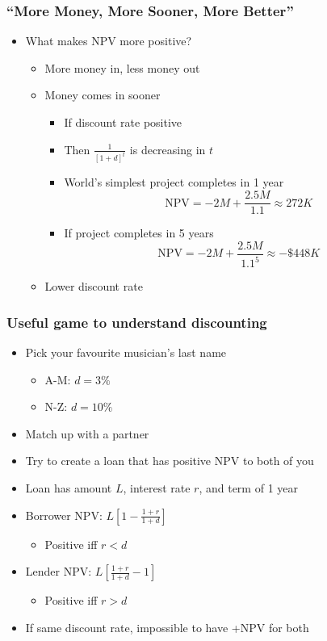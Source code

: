 \documentclass{beamer}
\begin{document}
\begin{frame}
	\frametitle{``More Money, More Sooner, More Better''}
	\begin{itemize}
		\item What makes NPV more positive?
			\begin{itemize}
				\item More money in, less money out
				\item Money comes in sooner
					\begin{itemize}
						\item If discount rate positive
						\item Then $\frac{1}{\left[1+d\right]^t}$ is decreasing in $t$
						\item World's simplest project completes in 1 year
						$$\text{NPV} = -2M + \frac{2.5M}{1.1} \approx 272K$$
						\item If project completes in 5 years
						$$\text{NPV} = -2M + \frac{2.5M}{1.1^5} \approx -\$448K$$
					\end{itemize}
				\item Lower discount rate
			\end{itemize}
	\end{itemize}
\end{frame}

\begin{frame}
	\frametitle{Useful game to understand discounting}
	\begin{itemize}
		\item Pick your favourite musician's last name
			\begin{itemize}
				\item A-M: $d=3\%$
				\item N-Z: $d=10\%$
			\end{itemize}
		\item Match up with a partner
		\item Try to create a loan that has positive NPV to both of you
		\item Loan has amount $L$, interest rate $r$, and term of 1 year
		\item Borrower NPV: $L\left[1-\frac{1+r}{1+d}\right]$
			\begin{itemize}
				\item Positive iff $r<d$
			\end{itemize}
		\item Lender NPV: $L\left[\frac{1+r}{1+d}-1\right]$
			\begin{itemize}
				\item Positive iff $r>d$
			\end{itemize}
		\item If same discount rate, impossible to have +NPV for both
	\end{itemize}
\end{frame}
\end{document}
